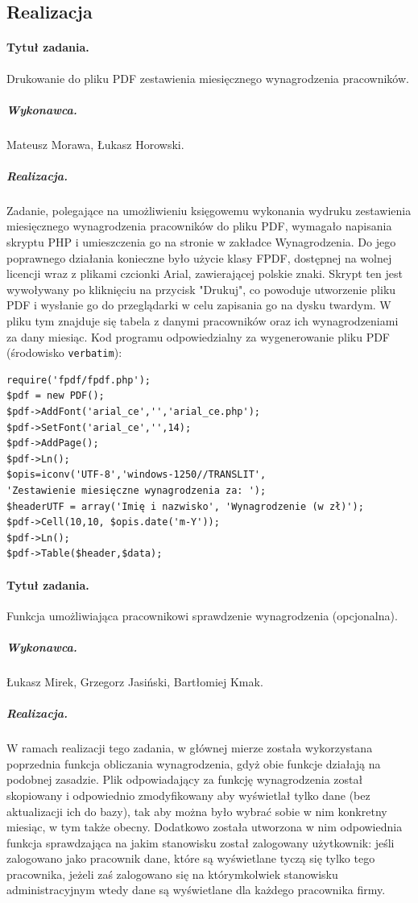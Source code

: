 \documentclass[a4paper]{article}
\begin{document}
\subsection{Realizacja}

\paragraph{Tytuł zadania.} Drukowanie do pliku PDF zestawienia miesięcznego wynagrodzenia pracowników.
\subparagraph{Wykonawca.} Mateusz Morawa, Łukasz Horowski.
\subparagraph{Realizacja.} Zadanie, polegające na umożliwieniu księgowemu wykonania wydruku zestawienia miesięcznego wynagrodzenia pracowników do pliku PDF, wymagało napisania skryptu PHP i umieszczenia go na stronie w zakładce Wynagrodzenia. Do jego poprawnego działania konieczne było użycie klasy FPDF, dostępnej na wolnej licencji wraz z plikami czcionki Arial, zawierającej polskie znaki. Skrypt ten jest wywoływany po kliknięciu na przycisk "Drukuj", co powoduje utworzenie pliku PDF i wysłanie go do przeglądarki w celu zapisania go na dysku twardym. W pliku tym znajduje się tabela z danymi pracowników oraz ich wynagrodzeniami za dany miesiąc. Kod programu odpowiedzialny za wygenerowanie pliku PDF (środowisko \texttt{verbatim}): \begin{verbatim}
require('fpdf/fpdf.php');
$pdf = new PDF();
$pdf->AddFont('arial_ce','','arial_ce.php');
$pdf->SetFont('arial_ce','',14);
$pdf->AddPage();
$pdf->Ln();
$opis=iconv('UTF-8','windows-1250//TRANSLIT',
'Zestawienie miesięczne wynagrodzenia za: ');
$headerUTF = array('Imię i nazwisko', 'Wynagrodzenie (w zł)');
$pdf->Cell(10,10, $opis.date('m-Y'));
$pdf->Ln();
$pdf->Table($header,$data);
\end{verbatim}

\paragraph{Tytuł zadania.} Funkcja umożliwiająca pracownikowi sprawdzenie wynagrodzenia (opcjonalna).
\subparagraph{Wykonawca.} Łukasz Mirek, Grzegorz Jasiński, Bartłomiej Kmak.
\subparagraph{Realizacja.} W ramach realizacji tego zadania, w głównej mierze została wykorzystana poprzednia funkcja obliczania wynagrodzenia, gdyż obie funkcje działają na podobnej zasadzie. Plik odpowiadający za funkcję wynagrodzenia został skopiowany i odpowiednio zmodyfikowany aby wyświetlał tylko dane (bez aktualizacji ich do bazy), tak aby można było wybrać sobie w nim konkretny miesiąc, w tym także obecny. Dodatkowo została utworzona w nim odpowiednia funkcja sprawdzająca na jakim stanowisku został zalogowany użytkownik: jeśli zalogowano jako pracownik dane, które są wyświetlane tyczą się tylko tego pracownika, jeżeli zaś zalogowano się na którymkolwiek stanowisku administracyjnym wtedy dane są wyświetlane dla każdego pracownika firmy.   
 
\end{document}
